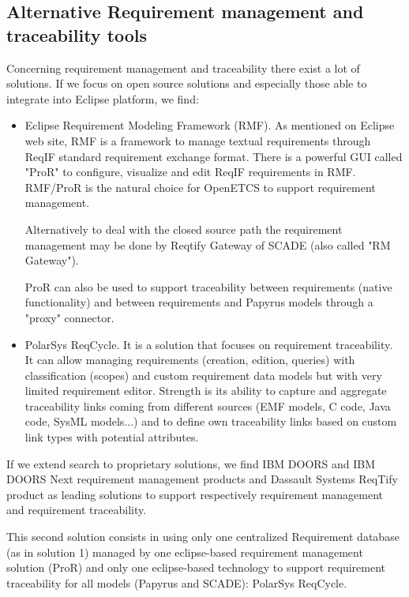 \documentclass[11pt]{template/openetcs_report}
\begin{document}
\subsection{Alternative Requirement management and traceability tools}
Concerning requirement management and traceability there exist a lot of solutions. If we focus on open source solutions and especially those able to integrate into Eclipse platform, we find:
\begin{itemize}
\item Eclipse Requirement Modeling Framework (RMF). As mentioned on Eclipse web site, RMF is a framework to manage textual requirements through ReqIF standard requirement exchange format. There is a powerful GUI called "ProR" to configure, visualize and edit ReqIF requirements in RMF.
RMF/ProR is the natural choice for OpenETCS to support requirement management.

Alternatively to deal with the closed source path the requirement management may
be done by Reqtify Gateway of SCADE (also called "RM Gateway"). 

ProR can also be used to support traceability between requirements (native functionality) and between requirements and Papyrus models through a "proxy" connector.

\item PolarSys ReqCycle. It is a solution that focuses on requirement traceability. It can allow managing requirements (creation, edition, queries) with classification (scopes) and custom requirement data models but with very limited requirement editor. Strength is its ability to capture and aggregate traceability links coming from different sources (EMF models, C code, Java code, SysML models...) and to define own traceability links based on custom link types with potential attributes.

\end{itemize}

If we extend search to proprietary solutions, we find IBM DOORS and IBM DOORS Next requirement management products and Dassault Systems ReqTify product as leading solutions to support respectively requirement management and requirement traceability.

This second solution consists in using only one centralized Requirement database (as in solution 1) managed by one eclipse-based requirement management solution (ProR) and only one eclipse-based technology to support requirement traceability for all models (Papyrus and SCADE): PolarSys ReqCycle.
\end{document}
